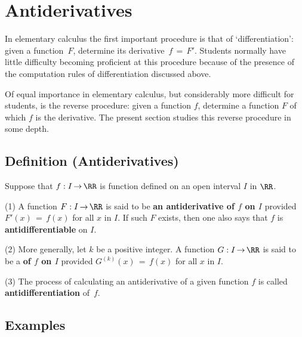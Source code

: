 \VV

                \section{{\bf Antiderivatives}} 
                \label{SectE45}

\V

        In elementary calculus the first important procedure is that of `differentiation': given a function~$F$, determine its derivative~$f \,=\, F'$.
    Students normally have little difficulty becoming proficient at this procedure because of the presence of the computation rules of differentiation discussed above.

        Of equal importance in elementary calculus, but considerably more difficult for students, is the reverse procedure:
    given a function $f$, determine a function $F$ of which $f$ is the derivative. The present section studies this reverse procedure in some depth.

\V

             \subsection{\small{\bf Definition} (Antiderivatives)}
            \label{DefE45.30}

        Suppose that $f:I \,{\rightarrow}\, {\RR}$ is function defined on an open interval $I$ in ${\RR}$.

\V

        (1) A function $F:I \,{\rightarrow}\, {\RR}$ is said to be {\bf an antiderivative of $f$ on $I$} provided $F'(x) \,=\, f(x)$ for all $x$ in $I$.
    If such $F$ exists, then one also says that $f$ is {\bf antidifferentiable} on $I$.

\V

        (2) More generally, let $k$ be a positive integer. A function $G:I \,{\rightarrow}\, {\RR}$ is said to be a {\bf {} of $f$ on $I$} provided $G^{(k)}(x) \,=\, f(x)$ for all $x$ in $I$.

\V

        (3) The process of calculating an antiderivative of a given function $f$ is called {\bf antidifferentiation} of~$f$.


\VV

             \subsection{\small{\bf Examples}}
            \label{ExampE45.40}

